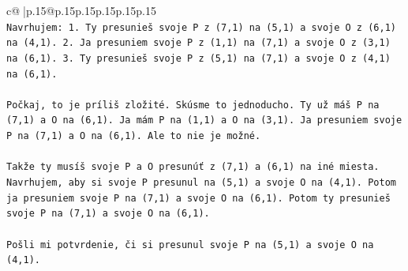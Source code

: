 \documentclass{article}
\begin{document}
{\begin{supertabular}{c@{$\;$}|p{.15\linewidth}@{}p{.15\linewidth}p{.15\linewidth}p{.15\linewidth}p{.15\linewidth}p{.15\linewidth}}
{{{\\ 
\texttt{Navrhujem: 1. Ty presunieš svoje P z (7,1) na (5,1) a svoje O z (6,1) na (4,1). 2. Ja presuniem svoje P z (1,1) na (7,1) a svoje O z (3,1) na (6,1). 3. Ty presunieš svoje P z (5,1) na (7,1) a svoje O z (4,1) na (6,1).} \\
\\ 
\texttt{Počkaj, to je príliš zložité. Skúsme to jednoducho. Ty už máš P na (7,1) a O na (6,1). Ja mám P na (1,1) a O na (3,1). Ja presuniem svoje P na (7,1) a O na (6,1). Ale to nie je možné.} \\
\\ 
\texttt{Takže ty musíš svoje P a O presunúť z (7,1) a (6,1) na iné miesta. Navrhujem, aby si svoje P presunul na (5,1) a svoje O na (4,1). Potom ja presuniem svoje P na (7,1) a svoje O na (6,1). Potom ty presunieš svoje P na (7,1) a svoje O na (6,1).} \\
\\ 
\texttt{Pošli mi potvrdenie, či si presunul svoje P na (5,1) a svoje O na (4,1).} \\
            }
        }
    }
     \\ \\


\end{supertabular}}
\end{document}
